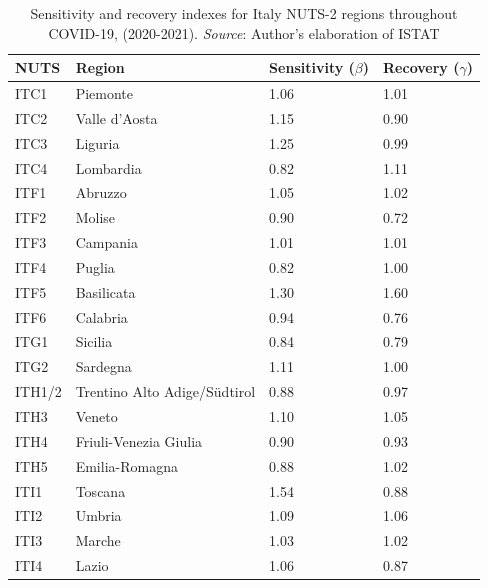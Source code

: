 \documentclass[12pt]{article}
\begin{document}
\begin{table}[h]
    \begin{center}
        \begin{tabular}{@{}llll@{}}
        \toprule[0.5pt]
        NUTS      &     Region                          & Sensitivity (\textit{$\beta$})  & Recovery (\textit{$\gamma$})    \\ \midrule[0.5pt]
        ITC1      & Piemonte                      & 1.06 & 1.01 \\
        ITC2      & Valle d'Aosta                 & 1.15 & 0.90 \\
        ITC3      & Liguria                       & 1.25 & 0.99 \\
        ITC4      & Lombardia                     & 0.82 & 1.11  \\
        ITF1      & Abruzzo                       & 1.05 & 1.02 \\
        ITF2      & Molise                        & 0.90 & 0.72 \\
        ITF3      & Campania                      & 1.01 & 1.01 \\
        ITF4      & Puglia                        & 0.82 & 1.00 \\
        ITF5      & Basilicata                    & 1.30 & 1.60 \\
        ITF6      & Calabria                      & 0.94   & 0.76 \\
        ITG1      & Sicilia                       & 0.84 & 0.79 \\
        ITG2      & Sardegna                      & 1.11 & 1.00 \\
        ITH1/2 & Trentino Alto Adige/S{\"u}dtirol & 0.88 & 0.97 \\
        ITH3      & Veneto                        & 1.10 & 1.05 \\
        ITH4      & Friuli-Venezia Giulia         & 0.90 & 0.93 \\
        ITH5      & Emilia-Romagna                & 0.88 & 1.02 \\
        ITI1      & Toscana                       & 1.54 & 0.88 \\
        ITI2      & Umbria                        & 1.09 & 1.06 \\
        ITI3      & Marche                        & 1.03 & 1.02 \\
        ITI4      & Lazio                         & 1.06 & 0.87 \\ \bottomrule[0.5pt]
        \end{tabular}
    \end{center}
    \caption{Sensitivity and recovery indexes for Italy NUTS-2 regions throughout COVID-19, (2020-2021). \textit{Source}: Author's elaboration of ISTAT \citeyear{istat}}
    \label{tab:resnuts2}
\end{table}
\end{document}
